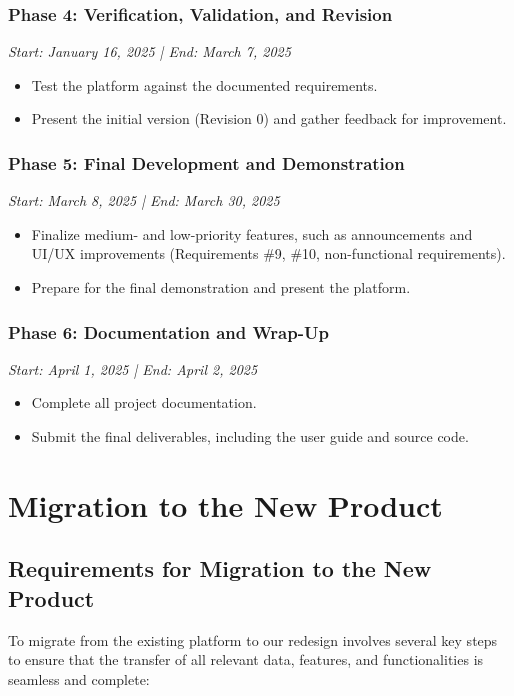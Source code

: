 \documentclass[12pt]{article}
\begin{document}
\subsubsection{Phase 4: Verification, Validation, and Revision}
\textit{Start: January 16, 2025 | End: March 7, 2025}
\begin{itemize}
    \item Test the platform against the documented requirements.
    \item Present the initial version (Revision 0) and gather feedback for improvement.
\end{itemize}

\subsubsection{Phase 5: Final Development and Demonstration}
\textit{Start: March 8, 2025 | End: March 30, 2025}
\begin{itemize}
    \item Finalize medium- and low-priority features, such as announcements and UI/UX improvements (Requirements \#9, \#10, non-functional requirements).
    \item Prepare for the final demonstration and present the platform.
\end{itemize}

\subsubsection{Phase 6: Documentation and Wrap-Up}
\textit{Start: April 1, 2025 | End: April 2, 2025}
\begin{itemize}
    \item Complete all project documentation.
    \item Submit the final deliverables, including the user guide and source code.
\end{itemize}


\section{Migration to the New Product}
\subsection{Requirements for Migration to the New Product}
To migrate from the existing platform to our redesign involves several key steps to ensure that the transfer of all relevant data, features, and functionalities is seamless and complete:
\end{document}

